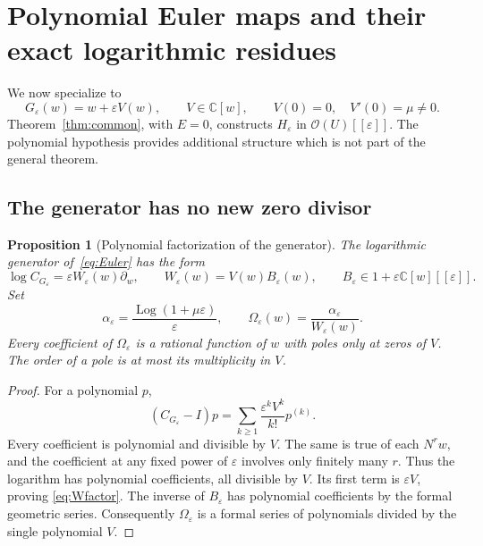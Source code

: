 \documentclass[11pt,a4paper]{article}
\numberwithin{equation}{section}
\newtheorem{proposition}[theorem]{Proposition}
\theoremstyle{definition}
\theoremstyle{remark}
\newcommand{\C}{\mathbb C}
\newcommand{\eps}{\varepsilon}
\newcommand{\Hol}{\mathcal O}
\newcommand{\Log}{\operatorname{Log}}
\begin{document}
\section{Polynomial Euler maps and their exact logarithmic residues}
\label{sec:polynomial}

We now specialize to
\begin{equation}\label{eq:Euler}
 G_\eps(w)=w+\eps V(w),\qquad V\in\C[w],
 \qquad V(0)=0,\quad V'(0)=\mu\ne0.
\end{equation}
Theorem~\ref{thm:common}, with $E=0$, constructs $H_\eps$ in
$\Hol(U)[[\eps]]$.  The polynomial hypothesis provides additional structure
which is not part of the general theorem.

\subsection{The generator has no new zero divisor}

\begin{proposition}[Polynomial factorization of the generator]
\label{prop:factorV}
The logarithmic generator of~\eqref{eq:Euler} has the form
\begin{equation}\label{eq:Wfactor}
 \log C_{G_\eps}=\eps W_\eps(w)\partial_w,
 \qquad W_\eps(w)=V(w)B_\eps(w),
 \qquad B_\eps\in1+\eps\C[w][[\eps]].
\end{equation}
Set
\begin{equation}\label{eq:alphaOmega}
 \alpha_\eps=\frac{\Log(1+\mu\eps)}\eps,
 \qquad \Omega_\eps(w)=\frac{\alpha_\eps}{W_\eps(w)}.
\end{equation}
Every coefficient of $\Omega_\eps$ is a rational function of $w$ with poles
only at zeros of $V$.  The order of a pole is at most its multiplicity in
$V$.
\end{proposition}

\begin{proof}
For a polynomial $p$,
\[
 (C_{G_\eps}-I)p
   =\sum_{k\ge1}\frac{\eps^k V^k}{k!}p^{(k)}.
\]
Every coefficient is polynomial and divisible by $V$.  The same is true of
each $N^r w$, and the coefficient at any fixed power of $\eps$ involves
only finitely many $r$.  Thus the logarithm has polynomial coefficients,
all divisible by $V$.  Its first term is $\eps V$, proving
\eqref{eq:Wfactor}.  The inverse of $B_\eps$ has polynomial coefficients by
the formal geometric series.  Consequently $\Omega_\eps$ is a formal series
of polynomials divided by the single polynomial $V$.
\end{proof}
\end{document}
